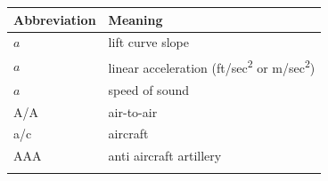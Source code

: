 \documentclass[
]{book}
\begin{document}
\begin{longtable}[]{@{}ll@{}}
\toprule
\begin{minipage}[b]{0.47\columnwidth}\raggedright
Abbreviation\strut
\end{minipage} & \begin{minipage}[b]{0.47\columnwidth}\raggedright
Meaning\strut
\end{minipage}\tabularnewline
\midrule
\endhead
\begin{minipage}[t]{0.47\columnwidth}\raggedright
\(a\)\strut
\end{minipage} & \begin{minipage}[t]{0.47\columnwidth}\raggedright
lift curve slope\strut
\end{minipage}\tabularnewline
\begin{minipage}[t]{0.47\columnwidth}\raggedright
\(a\)\strut
\end{minipage} & \begin{minipage}[t]{0.47\columnwidth}\raggedright
linear acceleration (ft/sec\textsuperscript{2} or m/sec\textsuperscript{2})\strut
\end{minipage}\tabularnewline
\begin{minipage}[t]{0.47\columnwidth}\raggedright
\(a\)\strut
\end{minipage} & \begin{minipage}[t]{0.47\columnwidth}\raggedright
speed of sound\strut
\end{minipage}\tabularnewline
\begin{minipage}[t]{0.47\columnwidth}\raggedright
A/A\strut
\end{minipage} & \begin{minipage}[t]{0.47\columnwidth}\raggedright
air-to-air\strut
\end{minipage}\tabularnewline
\begin{minipage}[t]{0.47\columnwidth}\raggedright
a/c\strut
\end{minipage} & \begin{minipage}[t]{0.47\columnwidth}\raggedright
aircraft\strut
\end{minipage}\tabularnewline
\begin{minipage}[t]{0.47\columnwidth}\raggedright
AAA\strut
\end{minipage} & \begin{minipage}[t]{0.47\columnwidth}\raggedright
anti aircraft artillery\strut
\end{minipage}\tabularnewline
\begin{minipage}[t]{0.47\columnwidth}\raggedright

\end{minipage}
\end{longtable}
\end{document}
